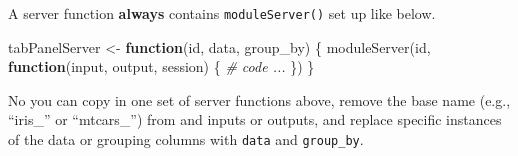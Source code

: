 \documentclass[
  oneside]{book}
\newenvironment{Shaded}{\begin{snugshade}}{\end{snugshade}}
\newcommand{\AttributeTok}[1]{\textcolor[rgb]{0.77,0.63,0.00}{#1}}
\newcommand{\CommentTok}[1]{\textcolor[rgb]{0.56,0.35,0.01}{\textit{#1}}}
\newcommand{\ConstantTok}[1]{\textcolor[rgb]{0.00,0.00,0.00}{#1}}
\newcommand{\ControlFlowTok}[1]{\textcolor[rgb]{0.13,0.29,0.53}{\textbf{#1}}}
\newcommand{\FloatTok}[1]{\textcolor[rgb]{0.00,0.00,0.81}{#1}}
\newcommand{\FunctionTok}[1]{\textcolor[rgb]{0.00,0.00,0.00}{#1}}
\newcommand{\NormalTok}[1]{#1}
\newcommand{\OtherTok}[1]{\textcolor[rgb]{0.56,0.35,0.01}{#1}}
\newcommand{\SpecialCharTok}[1]{\textcolor[rgb]{0.00,0.00,0.00}{#1}}
\begin{document}
A server function \textbf{always} contains \texttt{moduleServer()} set up like below.

\begin{Shaded}
\begin{Highlighting}[]
\NormalTok{tabPanelServer }\OtherTok{\textless{}{-}} \ControlFlowTok{function}\NormalTok{(id, data, group\_by) \{}
    \FunctionTok{moduleServer}\NormalTok{(id, }\ControlFlowTok{function}\NormalTok{(input, output, session) \{}
        \CommentTok{\# code ...}
\NormalTok{    \})}
\NormalTok{\}}
\end{Highlighting}
\end{Shaded}

No you can copy in one set of server functions above, remove the base name (e.g., ``iris\_'' or ``mtcars\_'') from and inputs or outputs, and replace specific instances of the data or grouping columns with \texttt{data} and \texttt{group\_by}.

\begin{Shaded}
\end{Shaded}
\end{document}
